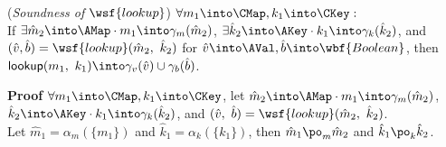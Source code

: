 \begin{thm} \normalfont
(\textit{Soundness of} $\wsf{lookup}$)
$\forall m_1 \into \CMap, k_1 \into \CKey :$\\
If $\exists \hat{m}_2 \into \AMap \cdot m_1 \into \gamma_m(\hat{m}_2)$,
$\exists \hat{k}_2 \into \AKey \cdot k_1 \into \gamma_k(\hat{k}_2)$,
and $(\hat{v}, \hat{b}) = \wsf{lookup}(\hat{m}_2,\ \hat{k}_2)$ 
for $\hat{v} \into \AVal, \hat{b} \into \wbf{Boolean}$,
then $\textsf{lookup}(m_1,\ k_1) \into \gamma_v(\hat{v}) \cup \gamma_b(\hat{b})$.
\end{thm}
\textbf{Proof } $\forall m_1 \into \CMap, k_1 \into \CKey$,
let $\hat{m}_2 \into \AMap \cdot m_1 \into \gamma_m(\hat{m}_2)$,
$\hat{k}_2 \into \AKey \cdot k_1 \into \gamma_k(\hat{k}_2)$,
and $(\hat{v},\ \hat{b}) = \wsf{lookup}(\hat{m}_2,\ \hat{k}_2)$.\\
Let $\hat{m}_1 = \alpha_m(\{ m_1 \})$ and $\hat{k}_1 = \alpha_k(\{ k_1 \})$,
then $\hat{m}_1 \po_m \hat{m}_2$ and $\hat{k}_1 \po_k \hat{k}_2$.
